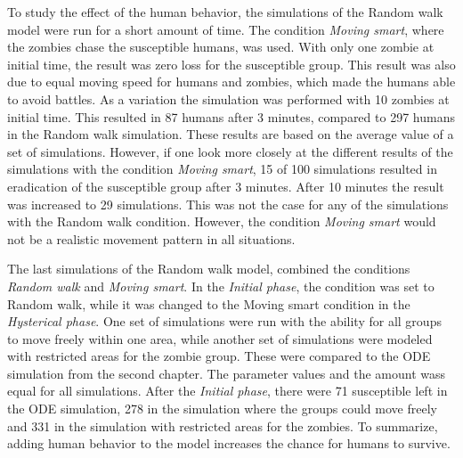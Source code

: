 \documentclass[%
twoside,                 %
final,                   %
chapterprefix=true,      %
open=right               %
10pt]{book}
\begin{document}
To study the effect of the human behavior, the simulations of the Random walk model were run for a short amount of time. The condition \emph{Moving smart}, where the zombies chase the susceptible humans, was used. With only one zombie at initial time, the result was zero loss for the susceptible group. This result was also due to equal moving speed for humans and zombies, which made the humans able to avoid battles. As a variation the simulation was performed with 10 zombies at initial time. This resulted in 87 humans after 3 minutes, compared to 297 humans in the Random walk simulation. These results are based on the average value of a set of simulations. However, if one look more closely at the different results of the simulations with the condition \emph{Moving smart}, 15 of 100 simulations resulted in eradication of the susceptible group after 3 minutes. After 10 minutes the result was increased to 29 simulations. This was not the case for any of the simulations with the Random walk condition. However, the condition \emph{Moving smart} would not be a realistic movement pattern in all situations. 


\vspace{3mm}




\vspace{3mm}


The last simulations of the Random walk model, combined the conditions \emph{Random walk} and \emph{Moving smart}. In the \emph{Initial phase}, the condition was set to Random walk, while it was changed to the Moving smart condition in the \emph{Hysterical phase}. One set of simulations were run with the ability for all groups to move freely within one area, while another set of simulations were modeled with restricted areas for the zombie group. These were compared to the ODE simulation from the second chapter. The parameter values and the amount wass equal for all simulations. After the \emph{Initial phase}, there were 71 susceptible left in the ODE simulation, 278 in the simulation where the groups could move freely and 331 in the simulation with restricted areas for the zombies. To summarize, adding human behavior to the model increases the chance for humans to survive.


\vspace{3mm}




\vspace{3mm}
\end{document}

